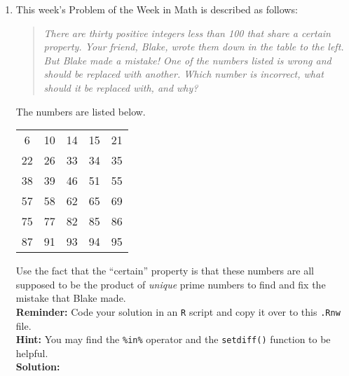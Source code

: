 \documentclass{article}\usepackage[]{graphicx}\usepackage[]{xcolor}
\begin{document}
\begin{enumerate}
\item This week's Problem of the Week in Math is described as follows:
\begin{quotation}
  \textit{There are thirty positive integers less than 100 that share a certain 
  property. Your friend, Blake, wrote them down in the table to the left. But 
  Blake made a mistake! One of the numbers listed is wrong and should be replaced 
  with another. Which number is incorrect, what should it be replaced with, and 
  why?}
\end{quotation}
The numbers are listed below.
\begin{center}
  \begin{tabular}{ccccc}
    6 & 10 & 14 & 15 & 21\\
    22 & 26 & 33 & 34 & 35\\
    38 & 39 & 46 & 51 & 55\\
    57 & 58 & 62 & 65 & 69\\
    75 & 77 & 82 & 85 & 86\\
    87 & 91 & 93 & 94 & 95
    \label{vals}
  \end{tabular}
\end{center}
Use the fact that the ``certain'' property is that these numbers are all supposed
to be the product of \emph{unique} prime numbers to find and fix the mistake that
Blake made.\\
\textbf{Reminder:} Code your solution in an \texttt{R} script and copy it over
to this \texttt{.Rnw} file.\\
\textbf{Hint:} You may find the \verb|%in%| operator and the \verb|setdiff()| function to be helpful.\\

\textbf{Solution:} 


\end{enumerate}
\end{document}
